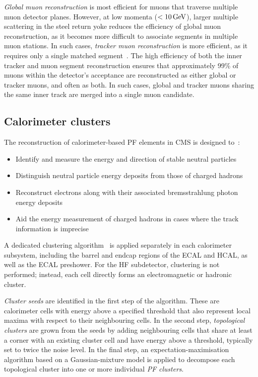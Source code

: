\textit{Global muon reconstruction} is most efficient for muons that traverse multiple muon detector planes. However, at low momenta ($<10\,\text{Ge\hspace{-.08em}V}$), larger multiple scattering in the steel return yoke reduces the efficiency of global muon reconstruction, as it becomes more difficult to associate segments in multiple muon stations. In such cases, \textit{tracker muon reconstruction} is more efficient, as it requires only a single matched segment~\cite{CMS_Muon_System_Performance_2}. The high efficiency of both the inner tracker and muon segment reconstruction ensures that approximately 99\% of muons within the detector's acceptance are reconstructed as either global or tracker muons, and often as both.  In such cases, global and tracker muons sharing the same inner track are merged into a single muon candidate.

\subsection{Calorimeter clusters}

The reconstruction of calorimeter-based \ac{PF} elements in \ac{CMS} is designed to~\cite{ParticleFlow}:

\begin{itemize}
    \item Identify and measure the energy and direction of stable neutral particles
    \item Distinguish neutral particle energy deposits from those of charged hadrons
    \item Reconstruct electrons along with their associated bremsstrahlung photon energy deposits
    \item Aid the energy measurement of charged hadrons in cases where the track information is imprecise
\end{itemize}

A dedicated clustering algorithm~\cite{ParticleFlow} is applied separately in each calorimeter subsystem, including the barrel and endcap regions of the \ac{ECAL} and \ac{HCAL}, as well as the \ac{ECAL} preshower. For the \ac{HF} subdetector, clustering is not performed; instead, each cell directly forms an electromagnetic or hadronic cluster. 

\textit{Cluster seeds} are identified in the first step of the algorithm. These are calorimeter cells with energy above a specified threshold that also represent local maxima with respect to their neighbouring cells. In the second step, \textit{topological clusters} are grown from the seeds by adding neighbouring cells that share at least a corner with an existing cluster cell and have energy above a threshold, typically set to twice the noise level. In the final step, an expectation-maximisation algorithm based on a Gaussian-mixture model is applied to decompose each topological cluster into one or more individual \textit{\ac{PF} clusters}.

